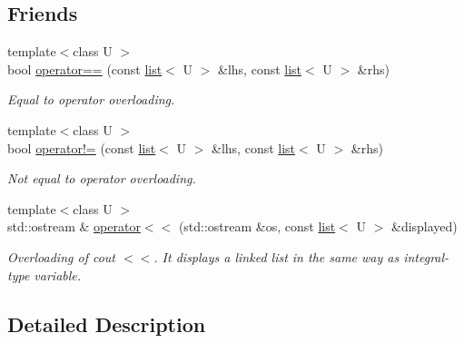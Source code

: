 \subsection*{Friends}
\begin{DoxyCompactItemize}
\item 
\hypertarget{classofeli_1_1list_a4ad2e66a0acf1d35b209f40c861aeae8}{{\footnotesize template$<$class U $>$ }\\bool \hyperlink{classofeli_1_1list_a4ad2e66a0acf1d35b209f40c861aeae8}{operator==} (const \hyperlink{classofeli_1_1list}{list}$<$ U $>$ \&lhs, const \hyperlink{classofeli_1_1list}{list}$<$ U $>$ \&rhs)}\label{classofeli_1_1list_a4ad2e66a0acf1d35b209f40c861aeae8}

\begin{DoxyCompactList}\small\item\em {\itshape Equal} {\itshape to} operator overloading. \end{DoxyCompactList}\item 
\hypertarget{classofeli_1_1list_a5f0cc9d1a3a2bcb2450cec7eb0f2dcb6}{{\footnotesize template$<$class U $>$ }\\bool \hyperlink{classofeli_1_1list_a5f0cc9d1a3a2bcb2450cec7eb0f2dcb6}{operator!=} (const \hyperlink{classofeli_1_1list}{list}$<$ U $>$ \&lhs, const \hyperlink{classofeli_1_1list}{list}$<$ U $>$ \&rhs)}\label{classofeli_1_1list_a5f0cc9d1a3a2bcb2450cec7eb0f2dcb6}

\begin{DoxyCompactList}\small\item\em {\itshape Not} {\itshape equal} {\itshape to} operator overloading. \end{DoxyCompactList}\item 
\hypertarget{classofeli_1_1list_ab34eccc5c4d4d114a5f6654becd48c9c}{{\footnotesize template$<$class U $>$ }\\std\-::ostream \& \hyperlink{classofeli_1_1list_ab34eccc5c4d4d114a5f6654becd48c9c}{operator$<$$<$} (std\-::ostream \&os, const \hyperlink{classofeli_1_1list}{list}$<$ U $>$ \&displayed)}\label{classofeli_1_1list_ab34eccc5c4d4d114a5f6654becd48c9c}

\begin{DoxyCompactList}\small\item\em Overloading of cout $<$$<$. It displays a linked list in the same way as integral-\/type variable. \end{DoxyCompactList}\end{DoxyCompactItemize}


\subsection{Detailed Description}
